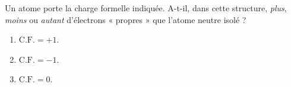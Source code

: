 \documentclass[11pt,a4paper]{article}
\begin{document}
\begin{exo}
Un atome porte la charge formelle indiquée. A-t-il, dans cette structure, \emph{plus},
\emph{moins} ou \emph{autant} d'électrons « propres » que l'atome neutre isolé ?
\begin{enumerate}[label=\alph*)]
  \item $\mathrm{C.F.} = +1$.
  \item $\mathrm{C.F.} = -1$.
  \item $\mathrm{C.F.} = 0$.
\end{enumerate}
\end{exo}
\end{document}
